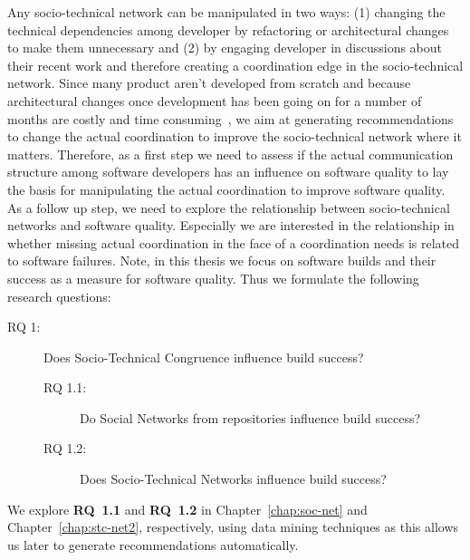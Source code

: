 Any socio-technical network can be manipulated in two ways: (1) changing the technical dependencies among developer by refactoring or architectural changes to make them unnecessary and (2) by engaging developer in discussions about their recent work and therefore creating a coordination edge in the socio-technical network.
Since many product aren't developed from scratch and because architectural changes once development has been going on for a number of months are costly and time consuming~\cite{vangurp:jss:2002}, we aim at generating recommendations to change the actual coordination to improve the socio-technical network where it matters.
Therefore, as a first step we need to assess if the actual communication structure among software developers has an influence on software quality to lay the basis for manipulating the actual coordination to improve software quality.
As a follow up step, we need to explore the relationship between socio-technical networks and software quality.
Especially we are interested in the relationship in whether missing actual coordination in the face of a coordination needs is related to software failures.
Note, in this thesis we focus on software builds and their success as a measure for software quality.
Thus we formulate the following research questions:
\begin{description}
%
\item[RQ 1:] Does Socio-Technical Congruence influence build success?
  \begin{description}
  \item[RQ 1.1:] Do Social Networks from repositories influence build success?
  \item[RQ 1.2:] Does Socio-Technical Networks influence build success?
  \end{description}
%
\end{description}
We explore \textbf{RQ~1.1} and \textbf{RQ~1.2} in Chapter~\ref{chap:soc-net} and Chapter~\ref{chap:stc-net2}, respectively, using data mining techniques as this allows us later to generate recommendations automatically.

